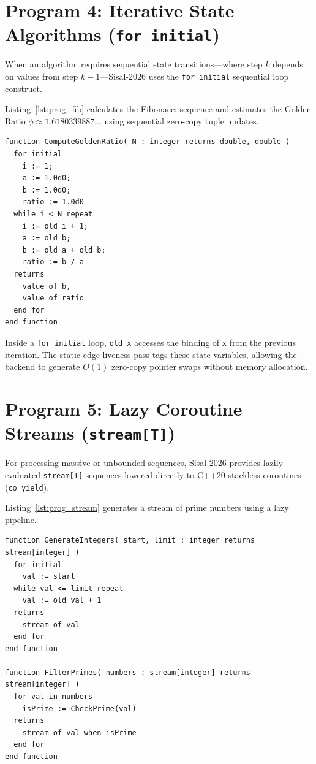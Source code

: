 \section{Program 4: Iterative State Algorithms (\texttt{for initial})}
When an algorithm requires sequential state transitions—where step $k$ depends on values from step $k-1$—Sisal-2026 uses the \texttt{for initial} sequential loop construct.

Listing~\ref{lst:prog_fib} calculates the Fibonacci sequence and estimates the Golden Ratio $\phi \approx 1.6180339887...$ using sequential zero-copy tuple updates.

\begin{lstlisting}[caption={Fibonacci and Golden Ratio Solver (\texttt{fibonacci.sis})},label={lst:prog_fib}]
function ComputeGoldenRatio( N : integer returns double, double )
  for initial
    i := 1;
    a := 1.0d0;
    b := 1.0d0;
    ratio := 1.0d0
  while i < N repeat
    i := old i + 1;
    a := old b;
    b := old a + old b;
    ratio := b / a
  returns
    value of b,
    value of ratio
  end for
end function
\end{lstlisting}

\begin{tip}
Inside a \texttt{for initial} loop, \texttt{old x} accesses the binding of \texttt{x} from the previous iteration. The static edge liveness pass tags these state variables, allowing the backend to generate $O(1)$ zero-copy pointer swaps without memory allocation.
\end{tip}

\section{Program 5: Lazy Coroutine Streams (\texttt{stream[T]})}
For processing massive or unbounded sequences, Sisal-2026 provides lazily evaluated \texttt{stream[T]} sequences lowered directly to C++20 stackless coroutines (\texttt{co\_yield}).

Listing~\ref{lst:prog_stream} generates a stream of prime numbers using a lazy pipeline.

\begin{lstlisting}[caption={Lazy Prime Stream Generator (\texttt{prime\_stream.sis})},label={lst:prog_stream}]
function GenerateIntegers( start, limit : integer returns stream[integer] )
  for initial
    val := start
  while val <= limit repeat
    val := old val + 1
  returns
    stream of val
  end for
end function

function FilterPrimes( numbers : stream[integer] returns stream[integer] )
  for val in numbers
    isPrime := CheckPrime(val)
  returns
    stream of val when isPrime
  end for
end function
\end{lstlisting}


